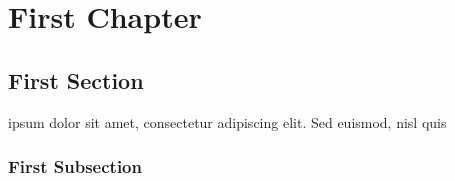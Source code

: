 \chapter*{First Chapter}

\section*{First Section}

ipsum dolor sit amet, consectetur adipiscing elit. Sed euismod, nisl quis

\subsection*{First Subsection}